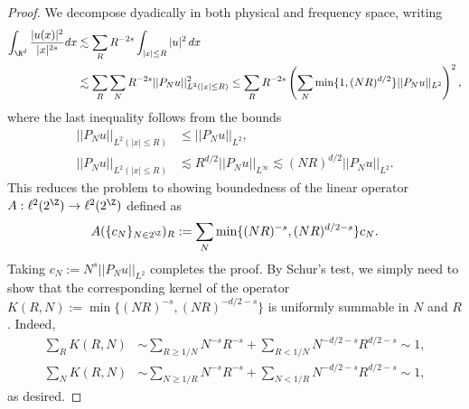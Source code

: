 \begin{proof}
	We decompose dyadically in both physical and frequency space, writing 
		\begin{align*}
			\int_{\R^d} \frac{|u(x)|^2}{|x|^{2s}} dx 
				&\lesssim \sum_R R^{-2s} \int_{|x| \leq R} |u|^2 \, dx \\
				&\lesssim \sum_R \sum_N R^{-2s} ||P_N u||_{L^2 (|x| \leq R)}^2 \leq  \sum_R  R^{-2s} \left(\sum_N \min\{ 1, (NR)^{d/2} \} ||P_N u||_{L^2}\right)^2 ,
		\end{align*}
	where the last inequality follows from the bounds
		\begin{align*}
			||P_N u||_{L^2 (|x| \leq R)} 
				&\leq ||P_N u||_{L^2} ,\\
			||P_N u||_{L^2 (|x| \leq R)}
				&\lesssim R^{d/2} ||P_N u||_{L^\infty} \lesssim (NR)^{d/2} ||P_N u||_{L^2}.
		\end{align*}	
	This reduces the problem to showing boundedness of the linear operator $A : \ell^2 (2^\Z) \to \ell^2 (2^\Z)$ defined as
		\[ A(\{c_N\}_{N \in 2^\Z})_R := \sum_N \min \{ (NR)^{-s}, (NR)^{d/2 - s} \} c_N. \]
	Taking $c_N := N^s ||P_N u||_{L^2}$ completes the proof. By Schur's test, we simply need to show that the corresponding kernel of the operator $K(R, N) :=  \min \{ (NR)^{-s}, (NR)^{-d/2 - s} \}$ is uniformly summable in $N$ and $R$. Indeed, 
		\begin{align*}
			\sum_{R} K(R, N) 
				&\sim \sum_{R \geq 1/N} N^{-s} R^{-s} + \sum_{R < 1/N} N^{-d/2 - s} R^{d/2- s} \sim 1, \\
			\sum_{N} K(R, N) 
				&\sim \sum_{N \geq 1/R} N^{-s} R^{-s} + \sum_{N < 1/R} N^{-d/2 - s} R^{d/2- s} \sim 1	,
		\end{align*}
	as desired. 
\end{proof}